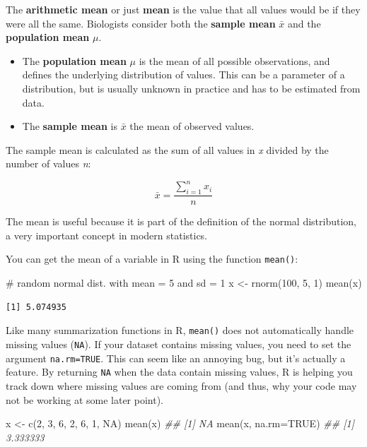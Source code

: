 \documentclass[
  13,
  letterpaper,
]{report}
\newenvironment{Shaded}{\begin{snugshade}}{\end{snugshade}}
\newcommand{\AttributeTok}[1]{\textcolor[rgb]{0.40,0.45,0.13}{#1}}
\newcommand{\CommentTok}[1]{\textcolor[rgb]{0.37,0.37,0.37}{#1}}
\newcommand{\ConstantTok}[1]{\textcolor[rgb]{0.56,0.35,0.01}{#1}}
\newcommand{\DecValTok}[1]{\textcolor[rgb]{0.68,0.00,0.00}{#1}}
\newcommand{\DocumentationTok}[1]{\textcolor[rgb]{0.37,0.37,0.37}{\textit{#1}}}
\newcommand{\FunctionTok}[1]{\textcolor[rgb]{0.28,0.35,0.67}{#1}}
\newcommand{\NormalTok}[1]{\textcolor[rgb]{0.00,0.23,0.31}{#1}}
\newcommand{\OtherTok}[1]{\textcolor[rgb]{0.00,0.23,0.31}{#1}}
\begin{document}
The \textbf{arithmetic mean} or just \textbf{mean} is the value that all
values would be if they were all the same. Biologists consider both the
\textbf{sample mean} \(\bar{x}\) and the \textbf{population mean}
\(\mu\).

\begin{itemize}
\item
  The \textbf{population mean} \(\mu\) is the mean of all possible
  observations, and defines the underlying distribution of values. This
  can be a parameter of a distribution, but is usually unknown in
  practice and has to be estimated from data.
\item
  The \textbf{sample mean} is \(\bar{x}\) the mean of observed values.
\end{itemize}

The sample mean is calculated as the sum of all values in \emph{x}
divided by the number of values \emph{n}:

\[\bar{x}=\frac{\sum_{i=1}^{n}x_i}{n}\]

The mean is useful because it is part of the definition of the normal
distribution, a very important concept in modern statistics.

You can get the mean of a variable in R using the function
\texttt{mean()}:

\begin{Shaded}
\begin{Highlighting}[]
\CommentTok{\# random normal dist. with mean = 5 and sd = 1}
\NormalTok{x }\OtherTok{\textless{}{-}} \FunctionTok{rnorm}\NormalTok{(}\DecValTok{100}\NormalTok{, }\DecValTok{5}\NormalTok{, }\DecValTok{1}\NormalTok{)}
\FunctionTok{mean}\NormalTok{(x)}
\end{Highlighting}
\end{Shaded}

\begin{verbatim}
[1] 5.074935
\end{verbatim}

Like many summarization functions in R, \texttt{mean()} does not
automatically handle missing values (\texttt{NA}). If your dataset
contains missing values, you need to set the argument
\texttt{na.rm=TRUE}. This can seem like an annoying bug, but it's
actually a feature. By returning \texttt{NA} when the data contain
missing values, R is helping you track down where missing values are
coming from (and thus, why your code may not be working at some later
point).

\begin{Shaded}
\begin{Highlighting}[]

\NormalTok{x }\OtherTok{\textless{}{-}} \FunctionTok{c}\NormalTok{(}\DecValTok{2}\NormalTok{, }\DecValTok{3}\NormalTok{, }\DecValTok{6}\NormalTok{, }\DecValTok{2}\NormalTok{, }\DecValTok{6}\NormalTok{, }\DecValTok{1}\NormalTok{, }\ConstantTok{NA}\NormalTok{)}
\FunctionTok{mean}\NormalTok{(x)}
\DocumentationTok{\#\# [1] NA}
\FunctionTok{mean}\NormalTok{(x, }\AttributeTok{na.rm=}\ConstantTok{TRUE}\NormalTok{)}
\DocumentationTok{\#\# [1] 3.333333}
\end{Highlighting}
\end{Shaded}
\end{document}

